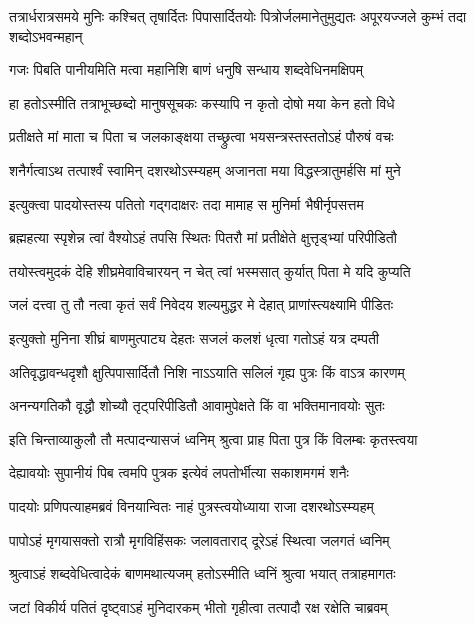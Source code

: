\threelineshloka
{तत्रार्धरात्रसमये मुनिः कश्चित् तृषार्दितः}
{पिपासार्दितयोः पित्रोर्जलमानेतुमुद्यतः}
{अपूरयज्जले कुम्भं तदा शब्दोऽभवन्महान्} %

\twolineshloka
{गजः पिबति पानीयमिति मत्वा महानिशि}
{बाणं धनुषि सन्धाय शब्दवेधिनमक्षिपम्} %

\twolineshloka
{हा हतोऽस्मीति तत्राभूच्छब्दो मानुषसूचकः}
{कस्यापि न कृतो दोषो मया केन हतो विधे} %

\twolineshloka
{प्रतीक्षते मां माता च पिता च जलकाङ्क्षया}
{तच्छ्रुत्वा भयसन्त्रस्तस्ततोऽहं पौरुषं वचः} %

\twolineshloka
{शनैर्गत्वाऽथ तत्पार्श्वं स्वामिन् दशरथोऽस्म्यहम्}
{अजानता मया विद्धस्त्रातुमर्हसि मां मुने} %

\twolineshloka
{इत्युक्त्वा पादयोस्तस्य पतितो गद्गदाक्षरः}
{तदा मामाह स मुनिर्मा भैषीर्नृपसत्तम} %

\twolineshloka
{ब्रह्महत्या स्पृशेन्न त्वां वैश्योऽहं तपसि स्थितः}
{पितरौ मां प्रतीक्षेते क्षुत्तृड्भ्यां परिपीडितौ} %

\twolineshloka
{तयोस्त्वमुदकं देहि शीघ्रमेवाविचारयन्}
{न चेत् त्वां भस्मसात् कुर्यात् पिता मे यदि कुप्यति} %

\twolineshloka
{जलं दत्त्वा तु तौ नत्वा कृतं सर्वं निवेदय}
{शल्यमुद्धर मे देहात् प्राणांस्त्यक्ष्यामि पीडितः} %

\twolineshloka
{इत्युक्तो मुनिना शीघ्रं बाणमुत्पाट्य देहतः}
{सजलं कलशं धृत्वा गतोऽहं यत्र दम्पती} %

\twolineshloka
{अतिवृद्धावन्धदृशौ क्षुत्पिपासार्दितौ निशि}
{नाऽऽयाति सलिलं गृह्य पुत्रः किं वाऽत्र कारणम्} %

\twolineshloka
{अनन्यगतिकौ वृद्धौ शोच्यौ तृट्परिपीडितौ}
{आवामुपेक्षते किं वा भक्तिमानावयोः सुतः} %

\twolineshloka
{इति चिन्ताव्याकुलौ तौ मत्पादन्यासजं ध्वनिम्}
{श्रुत्वा प्राह पिता पुत्र किं विलम्बः कृतस्त्वया} %

\twolineshloka
{देह्यावयोः सुपानीयं पिब त्वमपि पुत्रक}
{इत्येवं लपतोर्भीत्या सकाशमगमं शनैः} %

\twolineshloka
{पादयोः प्रणिपत्याहमब्रवं विनयान्वितः}
{नाहं पुत्रस्त्वयोध्याया राजा दशरथोऽस्म्यहम्} %

\twolineshloka
{पापोऽहं मृगयासक्तो रात्रौ मृगविहिंसकः}
{जलावताराद् दूरेऽहं स्थित्वा जलगतं ध्वनिम्} %

\twolineshloka
{श्रुत्वाऽहं शब्दवेधित्वादेकं बाणमथात्यजम्}
{हतोऽस्मीति ध्वनिं श्रुत्वा भयात् तत्राहमागतः} %

\twolineshloka
{जटां विकीर्य पतितं दृष्ट्वाऽहं मुनिदारकम्}
{भीतो गृहीत्वा तत्पादौ रक्ष रक्षेति चाब्रवम्} %

